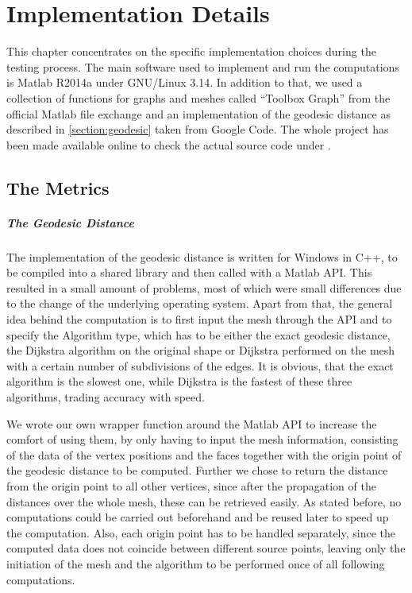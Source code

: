 \chapter{Implementation Details}
\label{chapter:implementation}

This chapter concentrates on the specific implementation choices during the testing process.
The main software used to implement and  run the computations is Matlab R2014a under GNU/Linux 3.14.
In addition to that, we used a collection of functions for graphs and meshes called ``Toolbox Graph'' from the official Matlab file exchange\cite{online_toolbox} and an implementation of the geodesic distance as described in \ref{section:geodesic} taken from Google Code\cite{online_geodesic}.
The whole project has been made available online to check the actual source code under \cite{online_github}.

\section{The Metrics}
\paragraph{The Geodesic Distance}
The implementation of the geodesic distance is written for Windows in C++, to be compiled into a shared library and then called with a Matlab API.
This resulted in a small amount of problems, most of which were small differences due to the change of the underlying operating system.
Apart from that, the general idea behind the computation is to first input the mesh through the API and to specify the Algorithm type, which has to be either the exact geodesic distance, the Dijkstra algorithm on the original shape or Dijkstra performed on the mesh with a certain number of subdivisions of the edges.
It is obvious, that the exact algorithm is the slowest one, while Dijkstra is the fastest of these three algorithms, trading accuracy with speed.

We wrote our own wrapper function around the Matlab API to increase the comfort of using them, by only having to input the mesh information, consisting of the data of the vertex positions and the faces together with the origin point of the geodesic distance to be computed.
Further we chose to return the distance from the origin point to all other vertices, since after the propagation of the distances over the whole mesh, these can be retrieved easily.
As stated before, no computations could be carried out beforehand and be reused later to speed up the computation.
Also, each origin point has to be handled separately, since the computed data does not coincide between different source points, leaving only the initiation of the mesh and the algorithm to be performed once of all following computations.

